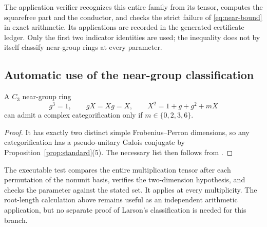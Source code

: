 The application verifier recognizes this entire family from its tensor,
computes the squarefree part and the conductor, and checks the strict
failure of \eqref{eq:near-bound} in exact arithmetic. Its applications
are recorded in the generated certificate ledger. Only the first two
indicator identities are used; the inequality does not by itself
classify near-group rings at every parameter.


\subsection{Automatic use of the near-group classification}
\begin{proposition}\label{prop:larson-automatic}
A $C_3$ near-group ring
\[
 g^3=1,\qquad gX=Xg=X,\qquad X^2=1+g+g^2+mX
\]
can admit a complex categorification only if $m\in\{0,2,3,6\}$.
\end{proposition}
\begin{proof}
It has exactly two distinct simple Frobenius--Perron dimensions, so any
categorification has a pseudo-unitary Galois conjugate by
Proposition~\ref{prop:standard}(5). The necessary list then follows from
\cite[Theorem~1.1]{Larson}.
\end{proof}
The executable test compares the entire multiplication tensor after each
permutation of the nonunit basis, verifies the two-dimension hypothesis,
and checks the parameter against the stated set. It applies at every
multiplicity. The root-length calculation above remains useful as an
independent arithmetic application, but no separate proof of Larson's
classification is needed for this branch.
